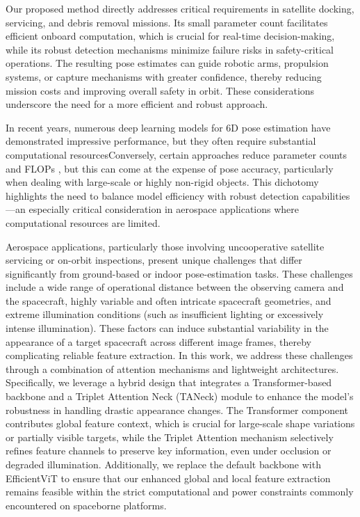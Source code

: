 \documentclass[a4paper,fleqn]{cas-sc}
\begin{document}
Our proposed method directly addresses critical requirements in satellite docking, servicing, and debris removal missions. Its small parameter count facilitates efficient onboard computation, which is crucial for real-time decision-making, while its robust detection mechanisms minimize failure risks in safety-critical operations. The resulting pose estimates can guide robotic arms, propulsion systems, or capture mechanisms with greater confidence, thereby reducing mission costs and improving overall safety in orbit. These considerations underscore the need for a more efficient and robust approach.

In recent years, numerous deep learning models for 6D pose estimation have demonstrated impressive performance, but they often require substantial computational resourcesConversely, certain approaches reduce parameter counts and FLOPs \citep{Zhao_2020_CVPR}, but this can come at the expense of pose accuracy, particularly when dealing with large-scale or highly non-rigid objects. This dichotomy highlights the need to balance model efficiency with robust detection capabilities—an especially critical consideration in aerospace applications where computational resources are limited.

Aerospace applications, particularly those involving uncooperative satellite servicing or on-orbit inspections, present unique challenges that differ significantly from ground-based or indoor pose-estimation tasks. These challenges include a wide range of operational distance between the observing camera and the spacecraft, highly variable and often intricate spacecraft geometries, and extreme illumination conditions (such as insufficient lighting or excessively intense illumination). These factors can induce substantial variability in the appearance of a target spacecraft across different image frames, thereby complicating reliable feature extraction. In this work, we address these challenges through a combination of attention mechanisms and lightweight architectures. Specifically, we leverage a hybrid design that integrates a Transformer-based backbone and a Triplet Attention Neck (TANeck) module to enhance the model's robustness in handling drastic appearance changes. The Transformer component contributes global feature context, which is crucial for large-scale shape variations or partially visible targets, while the Triplet Attention mechanism selectively refines feature channels to preserve key information, even under occlusion or degraded illumination. Additionally, we replace the default backbone with EfficientViT to ensure that our enhanced global and local feature extraction remains feasible within the strict computational and power constraints commonly encountered on spaceborne platforms.
\end{document}
